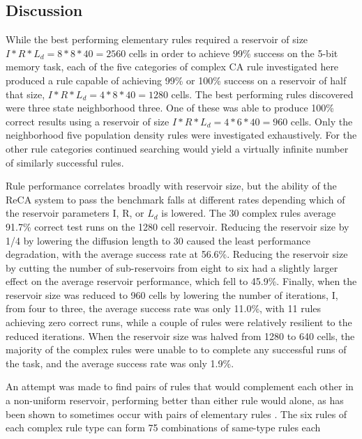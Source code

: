 \documentclass{facconf}
\begin{document}
\begin{multicols}{2}
\section{Discussion}\label{discussion}
While the best performing elementary rules required a reservoir of size $I * R 
* L_{d} = 8 * 8 * 40 = 2560$ cells in order to achieve 99\% success on the 
5-bit memory task, each of the five categories of complex CA rule investigated 
here produced a rule capable of achieving 99\% or 100\% success on a reservoir 
of half that size, $I * R * L_{d} = 4 * 8 * 40 = 1280$ cells. The best 
performing rules discovered were three state neighborhood three. One of these 
was able to produce 100\% correct results using a reservoir of size $I * R * 
L_{d} = 4 * 6 * 40 = 960$ cells. Only the neighborhood five population density 
rules were investigated exhaustively.  For the other rule categories continued 
searching would yield a virtually infinite number of similarly successful 
rules. \par Rule performance correlates broadly with reservoir size, but the 
ability of the ReCA system to  pass the benchmark falls at different rates 
depending which of the reservoir parameters I, R, or $L_{d}$ is lowered. The 30 
complex rules average 91.7\% correct test runs on the 1280 cell reservoir.  
Reducing the reservoir size by 1/4 by lowering the diffusion length to 30 
caused the least performance degradation, with the average success rate at 
56.6\%. Reducing the reservoir size by cutting the number of sub-reservoirs 
from eight to six had a slightly larger effect on the average reservoir 
performance, which fell to 45.9\%.  Finally, when the reservoir size was 
reduced to 960 cells by lowering the number of iterations, I, from four to 
three, the average success rate was only 11.0\%, with 11 rules achieving zero 
correct runs, while a  couple of rules were  relatively resilient to the 
reduced iterations. When the reservoir size was halved from 1280 to 640  cells, 
        the majority of the complex rules were unable to to complete any 
        successful runs of the task, and the average success rate was only 
        1.9\%. \par An attempt was made to find pairs of rules that would 
        complement each other in a non-uniform reservoir, performing better 
        than either rule would alone, as has been shown to sometimes occur with 
        pairs of elementary rules \cite{nichele2017reservoir}. The six rules of 
        each complex rule type can form 75 combinations of same-type rules each 

\end{multicols}
\end{document}
